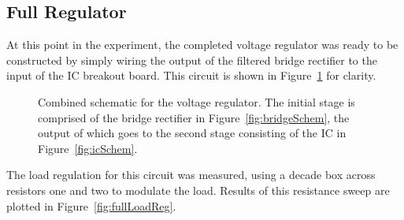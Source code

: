 \subsection{Full Regulator}
At this point in the experiment, the completed voltage regulator was ready to
be constructed by simply wiring the output of the filtered bridge rectifier to
the input of the IC breakout board.  This circuit is shown in
Figure~\ref{fig:fullSchem} for clarity.
%
\begin{figure}[H]
	\centering
	
	\parbox{.6\textwidth}{
	\caption[Schematic --- Combined Rectifier and IC]{Combined schematic for
	the voltage regulator.  The initial stage is comprised of the bridge
	rectifier in Figure~\ref{fig:bridgeSchem}, the output of which goes to the
	second stage consisting of the IC in Figure~\ref{fig:icSchem}.}
	\label{fig:fullSchem}
	}
\end{figure}
%
The load regulation for this circuit was measured, using a decade box across
resistors one and two to modulate the load.  Results of this resistance sweep
are plotted in Figure~\ref{fig:fullLoadReg}.
